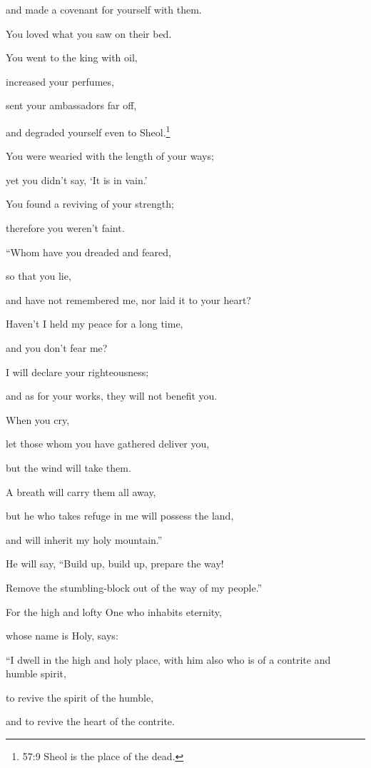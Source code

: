 and made a covenant for yourself with them.

You loved what you saw on their bed.

\myverse{}You went to the king with oil,

increased your perfumes,

sent your ambassadors far off,

and degraded yourself even to Sheol.\footnote{57:9 Sheol is the place of the dead.}

\myverse{}You were wearied with the length of your ways;

yet you didn’t say, ‘It is in vain.’

You found a reviving of your strength;

therefore you weren’t faint.


\vspace{\baselineskip} \myverse{}“Whom have you dreaded and feared,

so that you lie,

and have not remembered me, nor laid it to your heart?

Haven’t I held my peace for a long time,

and you don’t fear me?

\myverse{}I will declare your righteousness;

and as for your works, they will not benefit you.

\myverse{}When you cry,

let those whom you have gathered deliver you,

but the wind will take them.

A breath will carry them all away,

but he who takes refuge in me will possess the land,

and will inherit my holy mountain.”


\vspace{\baselineskip} \myverse{}He will say, “Build up, build up, prepare the way!

Remove the stumbling-block out of the way of my people.”

\myverse{}For the high and lofty One who inhabits eternity,

whose name is Holy, says:

“I dwell in the high and holy place, with him also who is of a contrite and humble spirit,

to revive the spirit of the humble,

and to revive the heart of the contrite.

